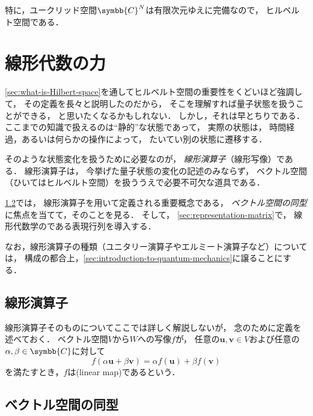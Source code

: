 \documentclass[
]{sotsu}
\begin{document}
特に，ユークリッド空間$\symbb{C}^N$は有限次元ゆえに完備なので，
ヒルベルト空間である．




\section{線形代数の力}
\label{sec:linear-algebra}

\cref{sec:what-is-Hilbert-space}を通してヒルベルト空間の重要性をくどいほど強調して，
その定義を長々と説明したのだから，
そこを理解すれば量子状態を扱うことができる，
と思いたくなるかもしれない．
しかし，それは早とちりである．
ここまでの知識で扱えるのは``静的''な状態であって，
実際の状態は，
時間経過，あるいは何らかの操作によって，
たいてい別の状態に遷移する．

そのような状態変化を扱うために必要なのが，
\emph{線形演算子}（線形写像）である．
線形演算子は，
今挙げた量子状態の変化の記述のみならず，
ベクトル空間（ひいてはヒルベルト空間）を扱ううえで必要不可欠な道具である．

\cref{sec:isomorphic}では，
線形演算子を用いて定義される重要概念である，
\emph{ベクトル空間の同型}に焦点を当てて，そのことを見る．
そして，
\cref{sec:representation-matrix}で，
線形代数学のである表現行列を導入する．

なお，線形演算子の種類（ユニタリー演算子やエルミート演算子など）については，
構成の都合上，\cref{sec:introduction-to-quantum-mechanics}に譲ることにする．





\subsection{線形演算子}

線形演算子そのものについてここでは詳しく解説しないが，
念のために定義を述べておく．
ベクトル空間$V$から$W$への写像$f$が，
任意の$\symbf{u}, \symbf{v} \in V$および任意の$\alpha, \beta \in \symbb{C}$に対して
\begin{equation*}
    f (\alpha \symbf{u} + \beta \symbf{v})
    = \alpha f (\symbf{u}) + \beta f (\symbf{v})
\end{equation*}
を満たすとき，$f$は(linear map)であるという．




\subsection{ベクトル空間の同型}
\label{sec:isomorphic}
\end{document}
